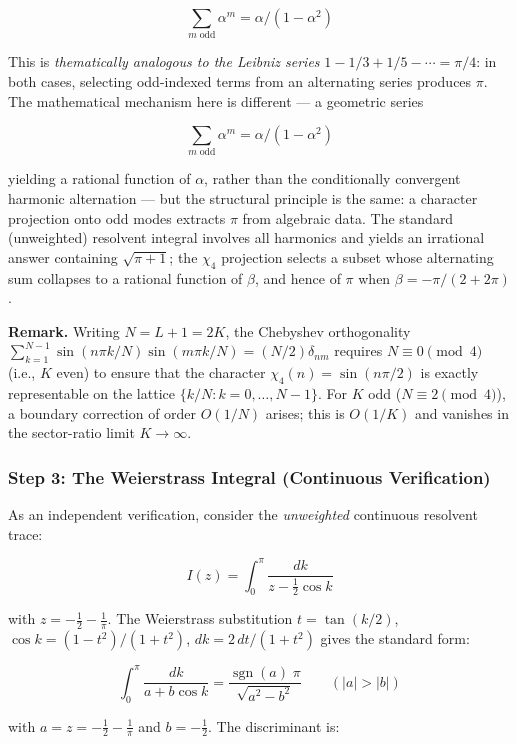 \documentclass[
  11pt,
]{article}
\begin{document}
\[\sum_{m\;\mathrm{odd}} \alpha^m = \alpha/(1-\alpha^2)\]

This is \emph{thematically analogous to the Leibniz series}
\(1 - 1/3 + 1/5 - \cdots = \pi/4\): in both cases, selecting odd-indexed terms
from an alternating series produces \(\pi\). The mathematical mechanism here is
different --- a geometric series

\[\sum_{m\;\mathrm{odd}} \alpha^m = \alpha/(1-\alpha^2)\]

yielding a rational function of \(\alpha\), rather than the conditionally
convergent harmonic alternation --- but the structural principle is the same: a
character projection onto odd modes extracts \(\pi\) from algebraic data. The
standard (unweighted) resolvent integral involves all harmonics and yields an
irrational answer containing \(\sqrt{\pi+1}\); the \(\chi_4\) projection selects
a subset whose alternating sum collapses to a rational function of \(\beta\),
and hence of \(\pi\) when \(\beta = -\pi/(2+2\pi)\).

\textbf{Remark.} Writing \(N = L + 1 = 2K\), the Chebyshev orthogonality
\(\sum_{k=1}^{N-1} \sin(n\pi k/N)\sin(m\pi k/N) = (N/2)\delta_{nm}\) requires
\(N \equiv 0 \pmod{4}\) (i.e., \(K\) even) to ensure that the character
\(\chi_4(n) = \sin(n\pi/2)\) is exactly representable on the lattice
\(\lbrace{}k/N : k = 0, \ldots, N-1\rbrace{}\). For \(K\) odd
(\(N \equiv 2 \pmod{4}\)), a boundary correction of order \(O(1/N)\) arises;
this is \(O(1/K)\) and vanishes in the sector-ratio limit \(K \to \infty\).

\subsubsection{Step 3: The Weierstrass Integral (Continuous
Verification)}\label{step-3-the-weierstrass-integral-continuous-verification}

As an independent verification, consider the \emph{unweighted} continuous
resolvent trace:

\[I(z) = \int_0^\pi \frac{dk}{z - \tfrac{1}{2}\cos k}\]

with \(z = -\tfrac{1}{2} - \tfrac{1}{\pi}\). The Weierstrass substitution
\(t = \tan(k/2)\), \(\cos k = (1-t^2)/(1+t^2)\), \(dk = 2\,dt/(1+t^2)\) gives
the standard form:

\[\int_0^\pi \frac{dk}{a + b\cos k} = \frac{\operatorname{sgn}(a)\;\pi}{\sqrt{a^2 - b^2}} \qquad (|a| > |b|)\]

with \(a = z = -\tfrac{1}{2} - \tfrac{1}{\pi}\) and \(b = -\tfrac{1}{2}\). The
discriminant is:
\end{document}
